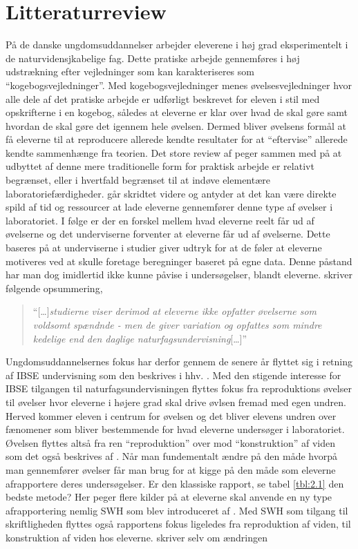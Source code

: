 \section{Litteraturreview}
\label{sec:rev}

På de danske ungdomsuddannelser arbejder eleverene i høj grad eksperimentelt i de naturvidensjkabelige fag. Dette pratiske arbejde gennemføres i høj udstrækning efter vejledninger som kan karakteriseres som ``kogebogsvejledninger''. Med kogebogsvejledninger menes øvelsesvejledninger hvor alle dele af det pratiske arbejde er udførligt beskrevet for eleven i stil med opskrifterne i en kogebog, således at eleverne er klar over hvad de skal gøre samt hvordan de skal gøre det igennem hele øvelsen. Dermed bliver øvelsens formål at få eleverne til at reproducere allerede kendte resultater for at ``eftervise'' allerede kendte sammenhænge fra teorien. Det store review af \citep{Miller2018} peger sammen med \citep{Hodson2008} på at udbyttet af denne mere traditionelle form for praktisk arbejde er relativt begrænset, eller i hvertfald begrænset til at indøve elementære laboratoriefærdigheder. \citep{Hodson2008} går skridtet videre og antyder at det kan være direkte spild af tid og ressourcer at lade eleverne gennemfører denne type af øvelser i laboratoriet.  I følge \citep{Hodson2008} er der en forskel mellem hvad eleverne reelt får ud af øvelserne  og det underviserne forventer at eleverne får ud af øvelserne. Dette baseres på at underviserne i studier giver udtryk for at de føler at eleverne motiveres ved at skulle foretage beregninger baseret på egne data. Denne påstand har man dog imidlertid ikke kunne påvise i undersøgelser, blandt eleverne. \citet{Krogh2016} skriver følgende opsummering,
\begin{quote}
``[\ldots]\emph{studierne viser derimod at eleverne ikke opfatter øvelserne som voldsomt spændnde - men de giver variation og opfattes som mindre kedelige end den daglige naturfagsundervisning}[\ldots]''
\end{quote}
Ungdomsuddannelsernes fokus har derfor gennem de senere år flyttet sig i retning af IBSE undervisning som den beskrives i hhv. \citep{Dolin2014, Krogh2016}. Med den stigende interesse for IBSE tilgangen til naturfagsundervisningen flyttes fokus fra reproduktions øvelser til øvelser hvor eleverne i højere grad skal drive øvlsen fremad med egen undren. Herved kommer eleven i centrum for øvelsen og det bliver elevens undren over fænomener som bliver bestemmende for hvad eleverne undersøger i laboratoriet. Øvelsen flyttes altså fra ren ``reproduktion'' over mod ``konstruktion'' af viden som det også beskrives af \citep{Krogh2016}. Når man fundementalt ændre på den måde hvorpå man gennemfører øvelser får man brug for at kigge på den måde som eleverne afrapportere deres undersøgelser. Er den klassiske rapport, se tabel \vref{tbl:2.1} den bedste metode?  Her peger flere kilder \citep[m.fl.]{Burke2005, Erkol2010} på at eleverne skal anvende en ny type afrapportering nemlig SWH som blev introduceret af \citep{Keys1999}. Med SWH som tilgang til skriftligheden flyttes også rapportens fokus ligeledes fra reproduktion af viden, til konstruktion af viden hos eleverne. \citet{Keys1999} skriver selv om ændringen 
